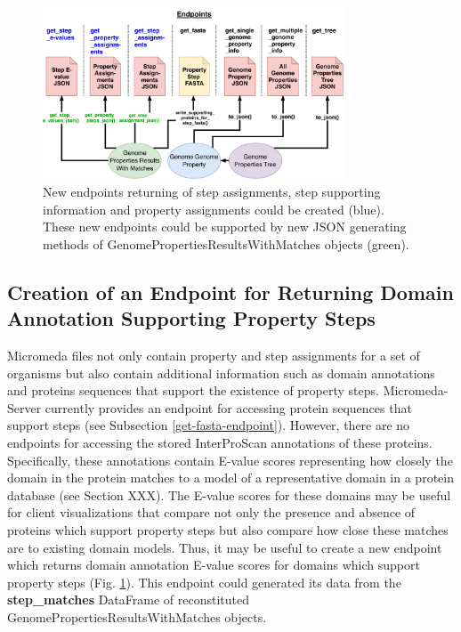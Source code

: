 \begin{figure}[!ht]
  \centering
	\includegraphics[width=0.8\textwidth]{media/micromeda-server-new-endpoints.pdf}
	 \caption{New endpoints returning of step assignments, step supporting information and property assignments could be created (blue). These new endpoints could be supported by new JSON generating methods of GenomePropertiesResultsWithMatches objects (green).}
	 \label{fig:new_endpoints}
\end{figure}

\subsection{Creation of an Endpoint for Returning Domain Annotation Supporting Property Steps} \label{e-value-endpoint}

Micromeda files not only contain property and step assignments for a set of organisms but also contain additional information such as domain annotations and proteins sequences that support the existence of property steps. Micromeda-Server currently provides an endpoint for accessing protein sequences that support steps (see Subsection \ref{get-fasta-endpoint}). However, there are no endpoints for accessing the stored InterProScan annotations of these proteins. Specifically, these annotations contain E-value scores representing how closely the domain in the protein matches to a model of a representative domain in a protein database (see Section XXX). The E-value scores for these domains may be useful for client visualizations that compare not only the presence and absence of proteins which support property steps but also compare how close these matches are to existing domain models. Thus, it may be useful to create a new endpoint which returns domain annotation E-value scores for domains which support property steps (Fig. \ref{fig:new_endpoints}). This endpoint could generated its data from the \textbf{step\_matches} DataFrame of reconstituted GenomePropertiesResultsWithMatches objects.

